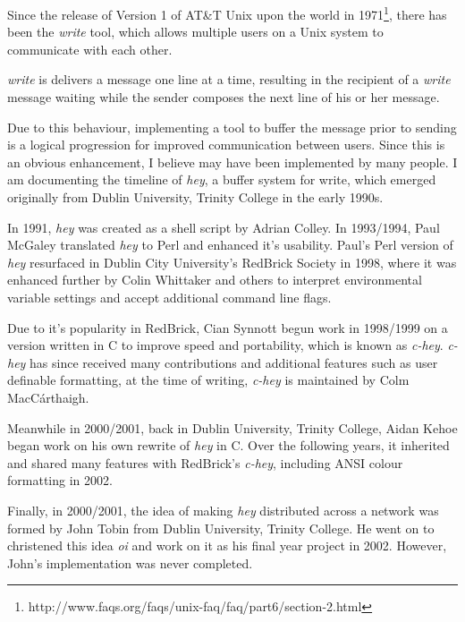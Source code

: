 Since the release of Version 1 of AT\&T Unix upon the world 
in 1971\footnote{http://www.faqs.org/faqs/unix-faq/faq/part6/section-2.html}, 
there has been the \emph{write} tool, which allows multiple users on a Unix 
system to communicate with each other.


\emph{write} is delivers a message one line at a time,
resulting in the recipient of a \emph{write} message waiting while the
sender composes the next line of his or her message.


Due to this behaviour, implementing a tool to buffer the message
prior to sending is a logical progression for improved communication
between users. Since this is an obvious enhancement, I believe 
may have been implemented by many people. I am documenting the 
timeline of \emph{hey}, a buffer system for write, which emerged 
originally from Dublin University, Trinity College in the early 1990s.


In 1991, \emph{hey} was created as a shell script by Adrian Colley. In 
1993/1994, Paul McGaley translated \emph{hey} to Perl and enhanced it's 
usability. Paul's Perl version of \emph{hey} resurfaced in Dublin City 
University's RedBrick Society in 1998, where it was enhanced further by
Colin Whittaker and others to interpret environmental variable settings 
and accept additional command line flags.


Due to it's popularity in RedBrick, Cian Synnott begun work in 1998/1999
on a version written in C to improve speed and portability, which is 
known as \emph{c-hey}. \emph{c-hey} has since received many 
contributions and additional features such as user definable formatting,
at the time of writing, \emph{c-hey} is maintained by Colm 
MacC\'{a}rthaigh.


Meanwhile in 2000/2001, back in Dublin University, Trinity College, Aidan 
Kehoe began work on his own rewrite of \emph{hey} in C. Over the 
following years, it inherited and shared many features with RedBrick's 
\emph{c-hey}, including ANSI colour formatting in 2002.


Finally, in 2000/2001, the idea of making \emph{hey} distributed across 
a network was formed by John Tobin from Dublin University, Trinity 
College.  He went on to christened this idea \emph{oi} and work on it 
as his final year project in 2002. However, John's implementation was
never completed.
